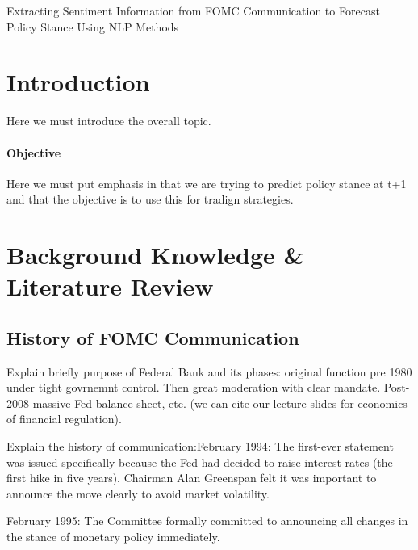 \documentclass[11pt]{article}
\begin{document}
\newpage
\tableofcontents
\newpage

\begin{center}
  {\Large Extracting Sentiment Information from FOMC Communication to Forecast Policy Stance Using NLP Methods\par}
\end{center}

\section{Introduction}
Here we must introduce the overall topic. 
\paragraph{Objective} Here we must put emphasis in that we are trying to predict policy stance at t+1 and that the objective is to use this for tradign strategies.



\section{Background Knowledge \& Literature Review}
\subsection{History of FOMC Communication}
Explain briefly purpose of Federal Bank and its phases: original function pre 1980 under tight govrnemnt control. Then great moderation with clear mandate. Post-2008 massive Fed balance sheet, etc. (we can cite our lecture slides for economics of financial regulation).

Explain the history of communication:February 1994: The first-ever statement was issued specifically because the Fed had decided to raise interest rates (the first hike in five years). Chairman Alan Greenspan felt it was important to announce the move clearly to avoid market volatility.

February 1995: The Committee formally committed to announcing all changes in the stance of monetary policy immediately.
\end{document}

